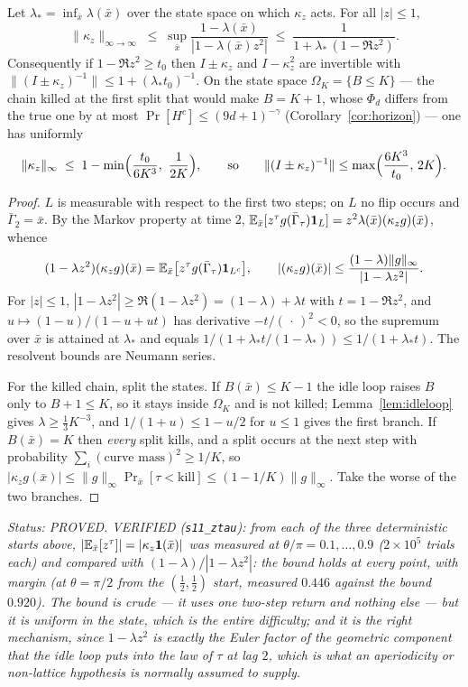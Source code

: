 \begin{theorem}\label{thm:idleloop}
Let $\lambda_*=\inf_{\bar x}\lambda(\bar x)$ over the state space on
which $\kappa_z$ acts.  For all $|z|\le1$,
\[
\|\kappa_z\|_{\infty\to\infty}\;\le\;
\sup_{\bar x}\frac{1-\lambda(\bar x)}{|1-\lambda(\bar x)z^2|}
\;\le\;\frac1{1+\lambda_*\,(1-\Re z^2)} .
\]
Consequently if $1-\Re z^2\ge t_0$ then $I\pm\kappa_z$ and
$I-\kappa_z^2$ are invertible with
$\|(I\pm\kappa_z)^{-1}\|\le1+(\lambda_*t_0)^{-1}$.  On the state space
$\Omega_K=\{B\le K\}$ --- the chain killed at the first split that
would make $B=K+1$, whose $\Phi_d$ differs from the true one by at most
$\Pr[H^c]\le(9d+1)^{-\gamma}$ (Corollary~\ref{cor:horizon}) --- one has
uniformly
\[
\|\kappa_z\|_\infty\;\le\;1-\min\Bigl(\frac{t_0}{6K^3},\ \frac1{2K}\Bigr),
\qquad\text{so}\qquad
\|(I\pm\kappa_z)^{-1}\|\le\max\Bigl(\frac{6K^3}{t_0},\,2K\Bigr).
\]
\end{theorem}

\begin{proof}
$L$ is measurable with respect to the first two steps; on $L$ no flip
occurs and $\bar\Gamma_2=\bar x$.  By the Markov property at time $2$,
$\mathbb{E}_{\bar x}[z^\tau g(\bar\Gamma_\tau)\mathbf 1_L]
=z^2\lambda(\bar x)(\kappa_zg)(\bar x)$, whence
\[
(1-\lambda z^2)(\kappa_zg)(\bar x)
=\mathbb{E}_{\bar x}\bigl[z^\tau g(\bar\Gamma_\tau)\mathbf 1_{L^c}\bigr],
\qquad
|(\kappa_zg)(\bar x)|\le\frac{(1-\lambda)\|g\|_\infty}{|1-\lambda z^2|} .
\]
For $|z|\le1$, $|1-\lambda z^2|\ge\Re(1-\lambda z^2)
=(1-\lambda)+\lambda t$ with $t=1-\Re z^2$, and
$u\mapsto(1-u)/(1-u+ut)$ has derivative $-t/(\,\cdot\,)^2<0$, so the
supremum over $\bar x$ is attained at $\lambda_*$ and equals
$1/(1+\lambda_*t/(1-\lambda_*))\le1/(1+\lambda_*t)$.  The resolvent
bounds are Neumann series.

For the killed chain, split the states.  If $B(\bar x)\le K-1$ the idle
loop raises $B$ only to $B+1\le K$, so it stays inside $\Omega_K$ and
is not killed; Lemma~\ref{lem:idleloop} gives
$\lambda\ge\tfrac13K^{-3}$, and $1/(1+u)\le1-u/2$ for $u\le1$ gives the
first branch.  If $B(\bar x)=K$ then \emph{every} split kills, and a
split occurs at the next step with probability
$\sum_i(\text{curve mass})^2\ge1/K$, so
$|\kappa_zg(\bar x)|\le\|g\|_\infty\Pr_{\bar x}[\tau<\text{kill}]
\le(1-1/K)\|g\|_\infty$.  Take the worse of the two branches.
\end{proof}

\emph{Status: PROVED.  VERIFIED (\texttt{s11\_ztau}): from each of the
three deterministic starts above,
$|\mathbb{E}_{\bar x}[z^\tau]|=|\kappa_z\mathbf 1(\bar x)|$ was measured at
$\theta/\pi=0.1,\dots,0.9$ ($2\times10^5$ trials each) and compared
with $(1-\lambda)/|1-\lambda z^2|$: the bound holds at every point,
with margin (at $\theta=\pi/2$ from the $(\tfrac12,\tfrac12)$ start,
measured $0.446$ against the bound $0.920$).  The bound is crude --- it
uses one two-step return and nothing else --- but it is \emph{uniform
in the state}, which is the entire difficulty; and it is the right
mechanism, since $1-\lambda z^2$ is exactly the Euler factor of the
geometric component that the idle loop puts into the law of $\tau$ at
lag $2$, which is what an aperiodicity or non-lattice hypothesis is
normally assumed to supply.}

